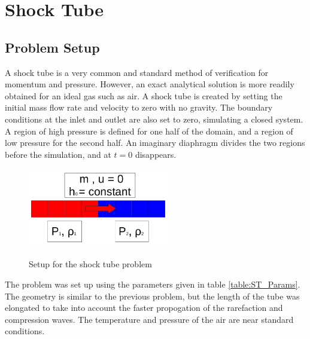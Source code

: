 \vspace*{-80mm}
\chapter{Shock Tube} \label{chapter5:Shock_Tube}
 
	\section{Problem Setup} \label{Verification:Shock_Tube}
        
    A shock tube is a very common and standard method of verification for
    momentum and pressure. However, an exact analytical solution is more readily
    obtained for an ideal gas such as air. A shock tube is created by setting
    the initial mass flow rate and velocity to zero with no gravity. The
    boundary conditions at the inlet and outlet are also set to zero, simulating
    a closed system. A region of high pressure is defined for one half of the
    domain, and a region of low pressure for the second half. An imaginary
    diaphragm divides the two regions before the simulation, and at $t=0$
    disappears.
    
    \begin{figure}[!h]
    	\centering
    	\includegraphics[width=0.55\textwidth]{images/Verification_Problem2_shock_tube}
    	\label{fig:Verification_2}
    	\caption{Setup for the shock tube problem}
    \end{figure}
    
    The problem was set up using the parameters given in table
    \ref{table:ST_Params}. The geometry is similar to the previous problem, but
    the length of the tube was elongated to take into account the faster
    propogation of the rarefaction and compression waves. The temperature and
    pressure of the air are near standard conditions.
    
